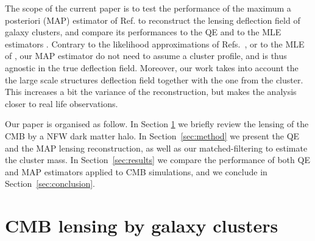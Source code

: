 \documentclass[prd, superscriptaddress, tightenlines, longbibliography, nofootinbib, eqsecnum, amsfonts, amsmath, floatfix, twocolumn, notitlepage]{revtex4-2}
\newcommand{\JC}[1]{\color{purple}{{JC:#1}}\color{black}\xspace}
\newcommand{\LL}[1]{{\color{orange}{LL: #1}}}
\begin{document}


The scope of the current paper is to test the performance of the maximum a posteriori (MAP) estimator of Ref. \cite{Carron:2017mqf} to reconstruct the lensing deflection field of galaxy clusters, and compare its performances to the QE and to the MLE estimators \LL{not sure if we compare to MLE in the end?}. 
Contrary to the likelihood approximations of Refs.~\cite{ Yoo:2008bf, Yoo:2010jd}, or to the MLE of \cite{Lewis:2005fq, Baxter:2014frs, Raghunathan:2017cle}, our MAP estimator do not need to assume a cluster profile, and is thus agnostic in the true deflection field. Moreover,  our work takes into account the the large scale structures deflection field together with the one from the cluster. This increases a bit the variance of the reconstruction, but makes the analysis closer to real life observations. 



Our paper is organised as follow. In Section \ref{sec:model} we briefly review the lensing of the CMB by a NFW dark matter halo. In Section~\ref{sec:method} we present the QE and the MAP lensing reconstruction, as well as our matched-filtering to estimate the cluster mass. In Section~\ref{sec:results} we compare the performance of both QE and MAP estimators applied to CMB simulations, and we conclude in Section~\ref{sec:conclusion}.


\section{CMB lensing by galaxy clusters}
\label{sec:model}
\end{document}
